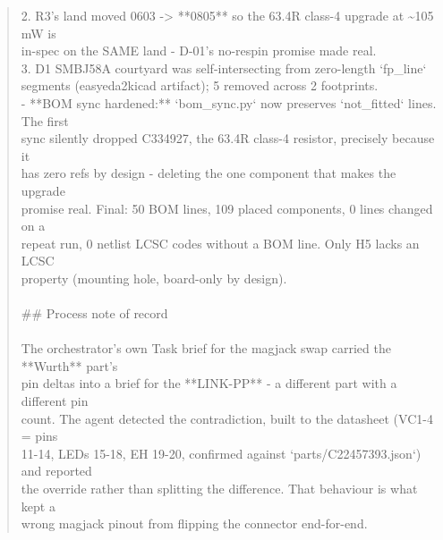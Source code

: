 \documentclass[11pt,a4paper]{article}
\begin{document}
\begin{quote}
  2. R3's land moved 0603 -\textgreater{} {*}{*}0805{*}{*} so the 63.4R class-4 upgrade at \textasciitilde{}105 mW is\\
     in-spec on the SAME land - D-01's no-respin promise made real.\\
  3. D1 SMBJ58A courtyard was self-intersecting from zero-length `fp\_line`\\
     segments (easyeda2kicad artifact); 5 removed across 2 footprints.\\
- {*}{*}BOM sync hardened:{*}{*} `bom\_sync.py` now preserves `not\_fitted` lines. The first\\
  sync silently dropped C334927, the 63.4R class-4 resistor, precisely because it\\
  has zero refs by design - deleting the one component that makes the upgrade\\
  promise real. Final: 50 BOM lines, 109 placed components, 0 lines changed on a\\
  repeat run, 0 netlist LCSC codes without a BOM line. Only H5 lacks an LCSC\\
  property (mounting hole, board-only by design).\\
~\\
\#\# Process note of record\\
~\\
The orchestrator's own Task brief for the magjack swap carried the {*}{*}Wurth{*}{*} part's\\
pin deltas into a brief for the {*}{*}LINK-PP{*}{*} - a different part with a different pin\\
count. The agent detected the contradiction, built to the datasheet (VC1-4 = pins\\
11-14, LEDs 15-18, EH 19-20, confirmed against `parts/C22457393.json`) and reported\\
the override rather than splitting the difference. That behaviour is what kept a\\
wrong magjack pinout from flipping the connector end-for-end.
\end{quote}
\end{document}
